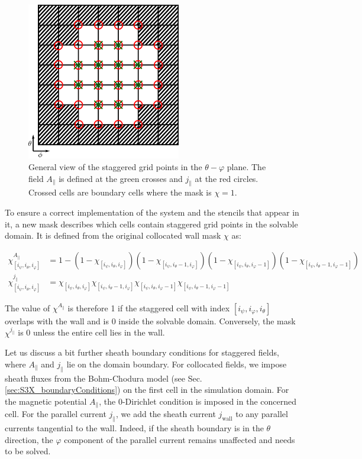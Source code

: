 \begin{figure}[H]
	\centering
	\includegraphics[width=0.6\textwidth]{schemes/staggeredGridBoundary.png}
	\caption{General view of the staggered grid points in the $\theta-\varphi$ plane. The field $A_\parallel$ is defined at the green crosses and $j_\parallel$ at the red circles. Crossed cells are boundary cells where the mask is $\chi = 1$. }
	\label{fig:StaggeredGridBC}
\end{figure}

To ensure a correct implementation of the system and the stencils that appear in it, a new mask describes which cells contain staggered grid points in the solvable domain. It is defined from the original collocated wall mask $\chi$ as:

\begin{align}
	\label{eq:def_chi_staggered}
	\chi^{A_\parallel}_{[i_\psi,i_\theta, i_\varphi]} &= 1 - 
	(1 - \chi_{[i_\psi,i_\theta  ,i_\varphi  ]})
	(1 - \chi_{[i_\psi,i_\theta-1,i_\varphi  ]})
	(1 - \chi_{[i_\psi,i_\theta  ,i_\varphi-1]})
	(1 - \chi_{[i_\psi,i_\theta-1,i_\varphi-1]}) \\
	\chi^{j_\parallel}_{[i_\psi,i_\theta, i_\varphi]} &= 
	\chi_{[i_\psi,i_\theta  ,i_\varphi  ]}
	\chi_{[i_\psi,i_\theta-1,i_\varphi  ]}
	\chi_{[i_\psi,i_\theta  ,i_\varphi-1]}
	\chi_{[i_\psi,i_\theta-1,i_\varphi-1]}
\end{align}

The value of $\chi^{A_\parallel}$ is therefore 1 if the staggered cell with index $[i_\psi,i_\varphi,i_\theta]$ overlaps with the wall and is 0 inside the solvable domain. Conversely, the mask $\chi^{j_\parallel}$ is 0 unless the entire cell lies in the wall. 


Let us discuss a bit further sheath boundary conditions for staggered fields, where $A_\parallel$ and $j_\parallel$ lie on the domain boundary. For collocated fields, we impose sheath fluxes from the Bohm-Chodura model (see Sec. \ref{sec:S3X_boundaryConditions}) on the first cell in the simulation domain. For the magnetic potential $A_\parallel$, the 0-Dirichlet condition is imposed in the concerned cell. For the parallel current $j_\parallel$, we add the sheath current $j_{\text{wall}}$ to any parallel currents tangential to the wall. Indeed, if the sheath boundary is in the $\theta$ direction, the $\varphi$ component of the parallel current remains unaffected and needs to be solved. 



